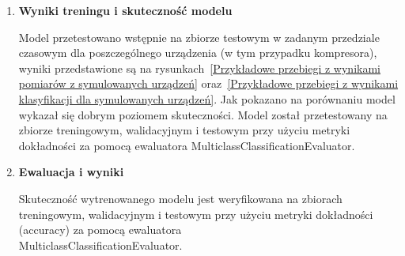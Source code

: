 \begin{enumerate}
    \item \textbf{Wyniki treningu i skuteczność modelu}

Model przetestowano wstępnie na zbiorze testowym w zadanym przedziale czasowym dla poszczególnego urządzenia (w tym przypadku kompresora), wyniki przedstawione są na rysunkach~\ref{Przykładowe przebiegi z wynikami pomiarów z symulowanych urządzeń} oraz~\ref{Przykładowe przebiegi z wynikami klasyfikacji dla symulowanych urządzeń}. Jak pokazano na porównaniu model wykazał się dobrym poziomem skuteczności. Model został przetestowany na zbiorze treningowym, walidacyjnym i testowym przy użyciu metryki dokładności za pomocą ewaluatora MulticlassClassificationEvaluator. 


\label{fig:prawdziwe_stany}

\label{fig:sklasyfikowane_stany}

    \item \textbf{Ewaluacja i wyniki}

Skuteczność wytrenowanego modelu jest weryfikowana na zbiorach treningowym, walidacyjnym i testowym przy użyciu metryki dokładności (accuracy) za pomocą ewaluatora \\ MulticlassClassificationEvaluator.


\end{enumerate}
